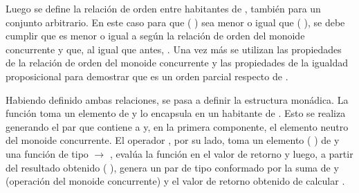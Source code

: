 \begin{AgdaAlign}
Luego se define la relación de orden entre habitantes de  , también para un conjunto  arbitrario. En este caso para que ( \AgdaInductiveConstructor{,} ) sea menor o igual que ( \AgdaInductiveConstructor{,} ), se debe cumplir que  es menor o igual a  según la relación de orden del monoide concurrente y que, al igual que antes,  \AgdaFunction{$\equiv$} . Una vez más se utilizan las propiedades de la relación de orden del monoide concurrente y las propiedades de la igualdad proposicional para demostrar que  es un orden parcial respecto de .

Habiendo definido ambas relaciones, se pasa a definir la estructura monádica. La función  toma un elemento  de  y lo encapsula en un habitante de  . Esto se realiza generando el par que contiene a  y, en la primera componente, el elemento neutro  del monoide concurrente. El operador , por su lado, toma un elemento ( \AgdaInductiveConstructor{,} ) de   y una función  de tipo  $\rightarrow$  , evalúa la función  en el valor de retorno  y luego, a partir del resultado obtenido ( \AgdaInductiveConstructor{,} ), genera un par de tipo   conformado por la suma de  y  (operación del monoide concurrente) y el valor de retorno  obtenido de calcular .


\end{AgdaAlign}

